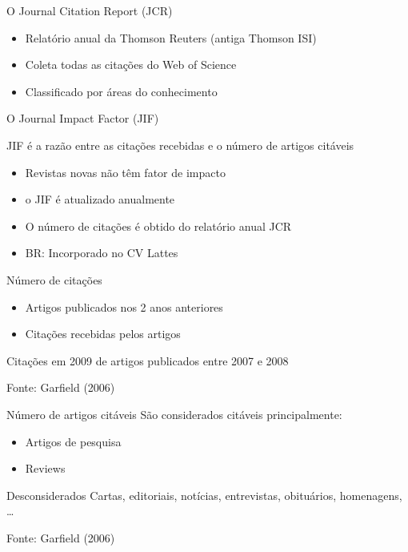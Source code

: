 \documentclass{beamer}
\begin{document}
\begin{frame}{O Journal Citation Report (JCR)}
  \begin{itemize}
  \item Relatório anual da Thomson Reuters (antiga Thomson ISI)
  \item Coleta todas as citações do Web of Science
  \item Classificado por áreas do conhecimento
  \end{itemize}
\end{frame}

\begin{frame}{O Journal Impact Factor (JIF)}
  \begin{definition}
    JIF é a razão entre as citações recebidas e o número de artigos citáveis
  \end{definition}
  \begin{itemize}
  \item Revistas novas não têm fator de impacto
  \item o JIF é atualizado anualmente
  \item O número de citações é obtido do relatório anual JCR
  \item BR: Incorporado no CV Lattes
  \end{itemize}
\end{frame}

\begin{frame}{Número de citações}

  \begin{itemize}
  \item Artigos publicados nos 2 anos anteriores
  \item Citações recebidas pelos artigos
  \end{itemize}
  \begin{example}
    Citações em 2009 de artigos publicados entre 2007 e 2008
  \end{example}

  \vfill
  Fonte: Garfield (2006)
\end{frame}

\begin{frame}{Número de artigos citáveis}
São considerados citáveis principalmente:
  \begin{itemize}
  \item Artigos de pesquisa
  \item Reviews
  \end{itemize}
  \begin{block}{Desconsiderados}
    Cartas, editoriais, notícias, entrevistas, obituários, homenagens, \ldots
  \end{block}

  \vfill
  Fonte: Garfield (2006)
\end{frame}
\end{document}
